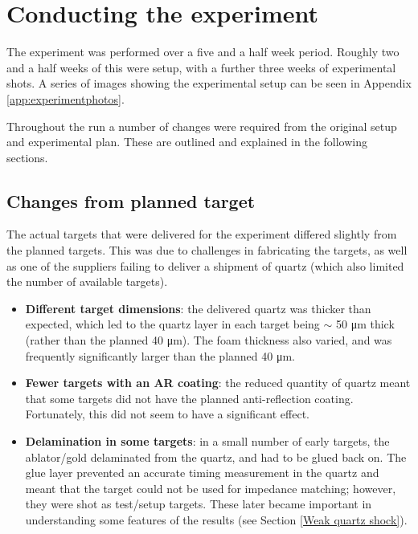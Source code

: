 
\section{Conducting the experiment}

The experiment was performed over a five and a half week period. Roughly two and a half weeks of this were setup, with a further three weeks of experimental shots. A series of images showing the experimental setup can be seen in Appendix \ref{app:experimentphotos}.

Throughout the run a number of changes were required from the original setup and experimental plan. These are outlined and explained in the following sections.

\subsection{Changes from planned target} \label{Target issues}
The actual targets that were delivered for the experiment differed slightly from the planned targets. This was due to challenges in fabricating the targets, as well as one of the suppliers failing to deliver a shipment of quartz (which also limited the number of available targets).
\begin{itemize}
    \item \textbf{Different target dimensions}: the delivered quartz was thicker than expected, which led to the quartz layer in each target being $\sim$ 50 \unit{\micro\meter} thick (rather than the planned 40 \unit{\micro\meter}). The foam thickness also varied, and was frequently significantly larger than the planned 40 \unit{\micro\meter}.
    \item \textbf{Fewer targets with an AR coating}: the reduced quantity of quartz meant that some targets did not have the planned anti-reflection coating. Fortunately, this did not seem to have a significant effect.
    \item \textbf{Delamination in some targets}: in a small number of early targets, the ablator/gold delaminated from the quartz, and had to be glued back on. The glue layer prevented an accurate timing measurement in the quartz and meant that the target could not be used for impedance matching; however, they were shot as test/setup targets. These later became important in understanding some features of the results (see Section \ref{Weak quartz shock}).
\end{itemize}

